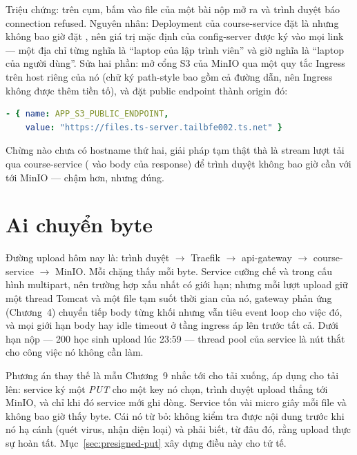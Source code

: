 \begin{pitfall}
Triệu chứng: trên cụm, bấm vào file của một bài nộp mở ra
 và trình duyệt báo connection refused.
Nguyên nhân: Deployment của course-service đặt 
là  nhưng không bao giờ đặt
, nên giá trị mặc định
 của config-server được ký vào mọi link ---
một địa chỉ từng nghĩa là ``laptop của lập trình viên'' và giờ nghĩa là
``laptop của người dùng''. Sửa hai phần: mở cổng S3 của MinIO qua một
quy tắc Ingress trên host riêng của nó (chữ ký path-style bao gồm cả
đường dẫn, nên Ingress không được thêm tiền tố), và đặt public endpoint
thành origin đó:
\begin{lstlisting}[language=yaml]
- { name: APP_S3_PUBLIC_ENDPOINT,
    value: "https://files.ts-server.tailbfe002.ts.net" }
\end{lstlisting}
Chừng nào chưa có hostname thứ hai, giải pháp tạm thật thà là stream
lượt tải qua course-service ( vào body của response) để
trình duyệt không bao giờ cần với tới MinIO --- chậm hơn, nhưng đúng.
\end{pitfall}

\section{Ai chuyển byte}

Đường upload hôm nay là: trình duyệt $\rightarrow$ Traefik $\rightarrow$
api-gateway $\rightarrow$ course-service $\rightarrow$ MinIO. Mỗi chặng
thấy mỗi byte. Service cưỡng chế  và
 trong cấu hình multipart, nên trường hợp
xấu nhất có giới hạn; nhưng mỗi lượt upload giữ một thread Tomcat và một
file tạm suốt thời gian của nó, gateway phản ứng (Chương~4) chuyển tiếp
body từng khối nhưng vẫn tiêu event loop cho việc đó, và mọi giới hạn
body hay idle timeout ở tầng ingress áp lên trước tất cả. Dưới hạn nộp
--- 200 học sinh upload lúc 23:59 --- thread pool của service là nút
thắt cho công việc nó không cần làm.

Phương án thay thế là mẫu Chương~9 nhắc tới cho tải xuống, áp dụng cho
tải lên: service ký một \emph{PUT} cho một key nó chọn, trình duyệt
upload thẳng tới MinIO, và chỉ khi đó service mới ghi dòng. Service tốn
vài micro giây mỗi file và không bao giờ thấy byte. Cái nó từ bỏ: không
kiểm tra được nội dung trước khi nó hạ cánh (quét virus, nhận diện
loại) và phải biết, từ đâu đó, rằng upload thực sự hoàn tất.
Mục~\ref{sec:presigned-put} xây dựng điều này cho tử tế.

